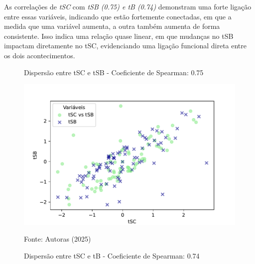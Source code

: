 As correlações de \textit{tSC} com \textit{tSB (0.75) e tB (0.74)} demonstram uma forte ligação entre essas variáveis, indicando que estão fortemente conectadas, em que a medida que uma variável aumenta, a outra também aumenta de forma consistente. Isso indica uma relação quase linear, em que mudanças no tSB impactam diretamente no tSC, evidenciando uma ligação funcional direta entre os dois acontecimentos.

\begin{figure}[h]
    \captionsetup{font=footnotesize, justification=centering, labelsep=period, position=above}
    \centering
    \begin{minipage}[b]{0.45\linewidth}
        \caption{Dispersão entre tSC e tSB - Coeficiente de Spearman: 0.75}
        \label{fig:tSC-tSB}
        \centering
        \includegraphics[scale=0.35]{figuras/Spearman/tSC-tSB.pdf}
        \vspace{0.3cm}
        \begin{minipage}{\linewidth}
            \centering
            \scriptsize{Fonte: Autoras (2025)}
        \end{minipage}
    \end{minipage}
    \hspace{0.05\linewidth}
    \begin{minipage}[b]{0.45\linewidth}
        \caption{Dispersão entre tSC e tB - Coeficiente de Spearman: 0.74}
        \label{fig:tSC-tB}
        \centering

\end{minipage}
\end{figure}
